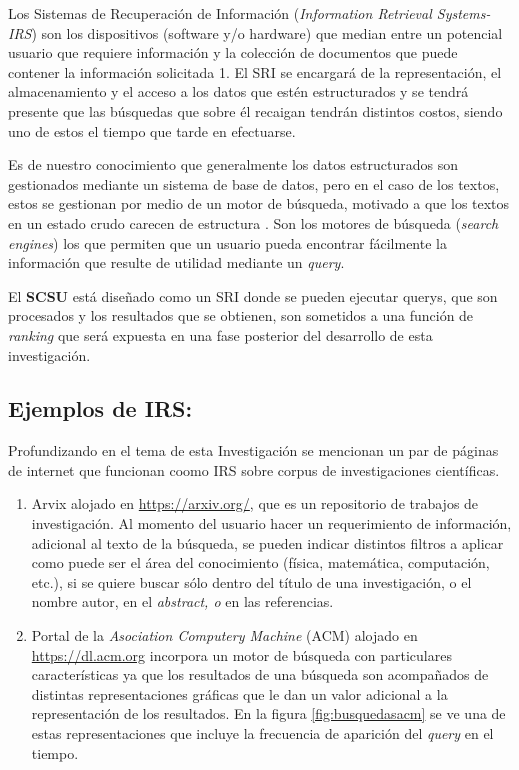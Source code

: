 \documentclass[
  10,
  openany]{book}
\begin{document}
Los Sistemas de Recuperación de Información (\emph{Information Retrieval Systems-IRS}) son los dispositivos (software y/o hardware) que median entre un potencial usuario que requiere información y la colección de documentos que puede contener la información solicitada \citep{kraft2017} 1. El SRI se encargará de la representación, el almacenamiento y el acceso a los datos que estén estructurados y se tendrá presente que las búsquedas que sobre él recaigan tendrán distintos costos, siendo uno de estos el tiempo que tarde en efectuarse.

Es de nuestro conocimiento que generalmente los datos estructurados son gestionados mediante un sistema de base de datos, pero en el caso de los textos, estos se gestionan por medio de un motor de búsqueda, motivado a que los textos en un estado crudo carecen de estructura \citep{miningt2012} . Son los motores de búsqueda (\emph{search engines}) los que permiten que un usuario pueda encontrar fácilmente la información que resulte de utilidad mediante un \emph{query}.

El \textbf{SCSU} está diseñado como un SRI donde se pueden ejecutar querys, que son procesados y los resultados que se obtienen, son sometidos a una función de \emph{ranking} que será expuesta en una fase posterior del desarrollo de esta investigación.

\hypertarget{ejemplos-de-irs}{%
\subsection{Ejemplos de IRS:}\label{ejemplos-de-irs}}

Profundizando en el tema de esta Investigación se mencionan un par de páginas de internet que funcionan coomo IRS sobre corpus de investigaciones científicas.

\begin{enumerate}
\def\labelenumi{\arabic{enumi}.}
\item
  Arvix alojado en \url{https://arxiv.org/}, que es un repositorio de trabajos de investigación. Al momento del usuario hacer un requerimiento de información, adicional al texto de la búsqueda, se pueden indicar distintos filtros a aplicar como puede ser el área del conocimiento (física, matemática, computación, etc.), si se quiere buscar sólo dentro del título de una investigación, o el nombre autor, en el \emph{abstract, o} en las referencias.
\item
  Portal de la \emph{Asociation Computery Machine} (ACM) alojado en \url{https://dl.acm.org} incorpora un motor de búsqueda con particulares características ya que los resultados de una búsqueda son acompañados de distintas representaciones gráficas que le dan un valor adicional a la representación de los resultados. En la figura \ref{fig:busquedasacm} se ve una de estas representaciones que incluye la frecuencia de aparición del \emph{query} en el tiempo.
\end{enumerate}
\end{document}
